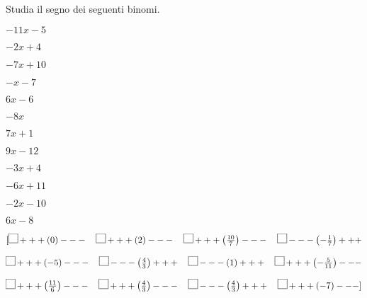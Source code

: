 \subsubsection*{}
\begin{esercizio}\label{ese:dis_3}
 Studia il segno dei seguenti binomi.
\begin{multicols}{4}
 \begin{enumeratea}
  \item  $-11 x -5$
  \item  $-2 x +4$
  \item  $-7 x +10$
  \item  $- x -7$
  \item  $6 x -6$
  \item  $-8 x $
  \item  $7 x +1$
  \item  $9 x -12$
  \item  $-3 x +4$
  \item  $-6 x +11$
  \item  $-2 x -10$
  \item  $6 x -8$
 \end{enumeratea}
\end{multicols}
\begin{flushright}
\vspace*{-8pt}
$[\framebox(10,10){}+++\left(0\right)--- \quad 
  \framebox(10,10){}+++\left(2\right)--- \quad
  \framebox(10,10){}+++\left(\frac{10}{7}\right)--- \quad 
  \framebox(10,10){}---\left(-\frac{1}{7}\right)+++ $
  
$ \framebox(10,10){}+++\left(-5\right)--- \quad 
  \framebox(10,10){}---\left(\frac{4}{3}\right)+++ \quad
  \framebox(10,10){}---\left(1\right)+++ \quad 
  \framebox(10,10){}+++\left(-\frac{5}{11}\right)--- $
  
$ \framebox(10,10){}+++\left(\frac{11}{6}\right)--- \quad 
  \framebox(10,10){}+++\left(\frac{4}{3}\right)--- \quad
  \framebox(10,10){}---\left(\frac{4}{3}\right)+++ \quad 
  \framebox(10,10){}+++\left(-7\right)--- ]$
\end{flushright}
\end{esercizio}

